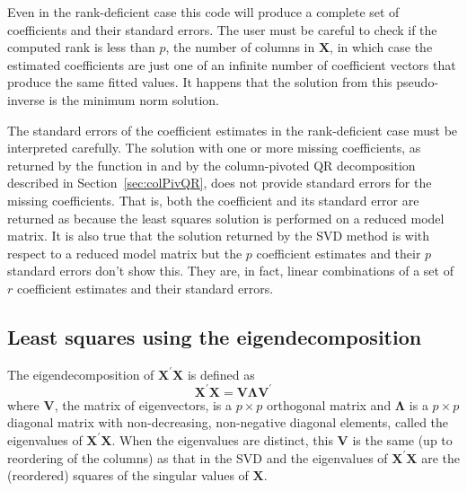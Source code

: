 \documentclass[shortnames,article,nojss]{jss}
\begin{document}
Even in the rank-deficient case this code will produce a complete set
of coefficients and their standard errors.  The user must be careful
to check if the computed rank is less than $p$, the number of columns
in $\bm X$, in which case the estimated coefficients are just one of
an infinite number of coefficient vectors that produce the same fitted
values.  It happens that the solution from this pseudo-inverse is the
minimum norm solution.

The standard errors of the coefficient estimates in the rank-deficient
case must be interpreted carefully.  The solution with one or more missing
coefficients, as returned by the  function in
 and by the column-pivoted QR decomposition described in
Section~\ref{sec:colPivQR}, does not provide standard errors for the
missing coefficients.  That is, both the coefficient and its standard
error are returned as  because the least squares solution is
performed on a reduced model matrix.  It is also true that the
solution returned by the SVD method is with respect to a reduced model
matrix but the $p$ coefficient estimates and their $p$ standard errors
don't show this.  They are, in fact, linear combinations of a set of
$r$ coefficient estimates and their standard errors.

\subsection{Least squares using the eigendecomposition}
\label{sec:eigendecomp}

The eigendecomposition of $\bm X^\prime\bm X$ is defined as
\begin{displaymath}
  \bm X^\prime\bm X=\bm V\bm\Lambda\bm V^\prime
\end{displaymath}
where $\bm V$, the matrix of eigenvectors, is a $p\times p$ orthogonal
matrix and $\bm\Lambda$ is a $p\times p$ diagonal matrix with
non-decreasing, non-negative diagonal elements, called the eigenvalues
of $\bm X^\prime\bm X$.  When the eigenvalues are distinct, this $\bm
V$ is the same (up to reordering of the columns) as that in the SVD
and the eigenvalues of $\bm X^\prime\bm X$ are the (reordered) squares
of the singular values of $\bm X$.
\end{document}
